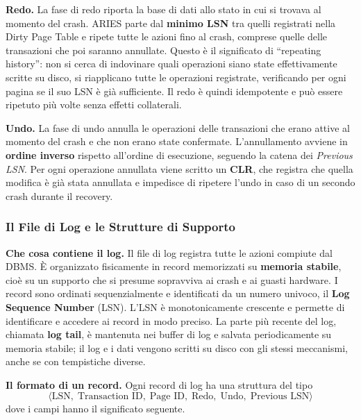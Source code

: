\documentclass[12pt]{extarticle}
\begin{document}
\medskip
\noindent \textbf{Redo.} La fase di redo riporta la base di dati allo stato in cui si trovava al momento del crash. ARIES parte dal \textbf{minimo LSN} tra quelli registrati nella Dirty Page Table e ripete tutte le azioni fino al crash, comprese quelle delle transazioni che poi saranno annullate. Questo è il significato di ``repeating history'': non si cerca di indovinare quali operazioni siano state effettivamente scritte su disco, si riapplicano tutte le operazioni registrate, verificando per ogni pagina se il suo LSN è già sufficiente. Il redo è quindi idempotente e può essere ripetuto più volte senza effetti collaterali.

\medskip
\noindent \textbf{Undo.} La fase di undo annulla le operazioni delle transazioni che erano attive al momento del crash e che non erano state confermate. L'annullamento avviene in \textbf{ordine inverso} rispetto all'ordine di esecuzione, seguendo la catena dei \textit{Previous LSN}. Per ogni operazione annullata viene scritto un \textbf{CLR}, che registra che quella modifica è già stata annullata e impedisce di ripetere l'undo in caso di un secondo crash durante il recovery.

\subsubsection{Il File di Log e le Strutture di Supporto}

\noindent \textbf{Che cosa contiene il log.} Il file di log registra tutte le azioni compiute dal DBMS. È organizzato fisicamente in record memorizzati su \textbf{memoria stabile}, cioè su un supporto che si presume sopravviva ai crash e ai guasti hardware. I record sono ordinati sequenzialmente e identificati da un numero univoco, il \textbf{Log Sequence Number} (LSN). L'LSN è monotonicamente crescente e permette di identificare e accedere ai record in modo preciso. La parte più recente del log, chiamata \textbf{log tail}, è mantenuta nei buffer di log e salvata periodicamente su memoria stabile; il log e i dati vengono scritti su disco con gli stessi meccanismi, anche se con tempistiche diverse.

\medskip
\noindent \textbf{Il formato di un record.} Ogni record di log ha una struttura del tipo
\[
\langle \text{LSN},\; \text{Transaction ID},\; \text{Page ID},\; \text{Redo},\; \text{Undo},\; \text{Previous LSN} \rangle
\]
dove i campi hanno il significato seguente.
\end{document}

